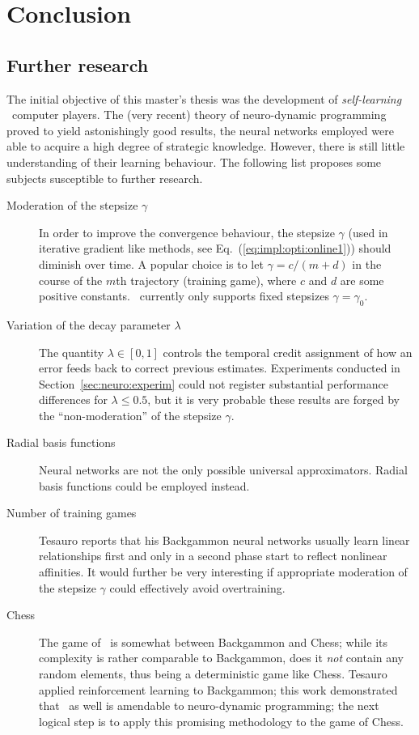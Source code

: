 \chapter{Conclusion} \label{cha:conclusion}

\section{Further research}
The initial objective of this master's thesis was the development of \emph{self-learning} \Abalone\ computer players. The (very recent) theory of neuro-dynamic programming proved to yield astonishingly good results, the neural networks employed were able to acquire a high degree of strategic knowledge. However, there is still little understanding of their learning behaviour. The following list proposes some subjects susceptible to further research.
\begin{description}
\item[Moderation of the stepsize $\gamma$] In order to improve the convergence behaviour, the stepsize $\gamma$ (used in iterative gradient like methods, see Eq.~(\ref{eq:impl:opti:online1})) should diminish over time. A popular choice is to let $\gamma = c/(m+d)$ in the course of the $m$th trajectory (training game), where $c$ and $d$ are some positive constants. \Malin\ currently only supports fixed stepsizes $\gamma = \gamma_0$.

\item[Variation of the decay parameter $\lambda$] The quantity $\lambda\in [0,1]$ controls the temporal credit assignment of how an error feeds back to correct previous estimates. Experiments conducted in Section~\ref{sec:neuro:experim} could not register substantial performance differences for $\lambda \leq 0.5$, but it is very probable these results are forged by the ``non-moderation'' of the stepsize $\gamma$.

\item[Radial basis functions] Neural networks are not the only possible universal approximators. Radial basis functions could be employed instead.

\item[Number of training games] Tesauro \cite{lig*Tesauro95} reports that his Backgammon neural net\-works usually learn linear relationships first and only in a second phase start to reflect nonlinear affinities. It would further be very interesting if appropriate moderation of the stepsize $\gamma$ could effectively avoid overtraining. 

\item[Chess] The game of \Abalone\ is somewhat between Backgammon and Chess; while its complexity is rather comparable to Backgammon, does it \emph{not} contain any random elements, thus being a deterministic game like Chess. Tesauro applied reinforcement learning to Backgammon; this work demonstrated that \Abalone\ as well is amendable to neuro-dynamic programming; the next logical step is to apply this promising methodology to the game of Chess.
\end{description}








